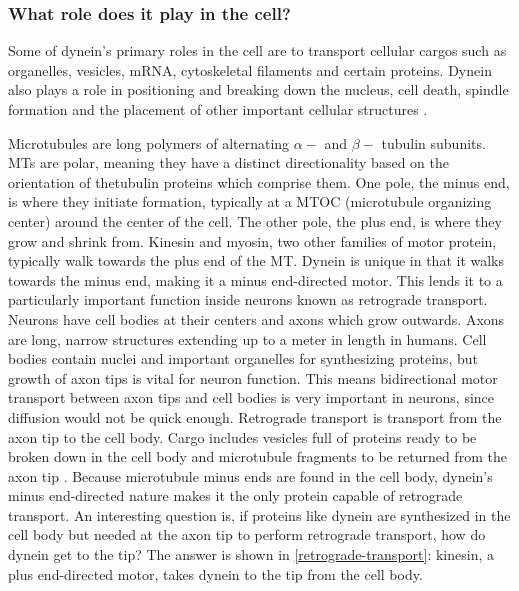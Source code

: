 \documentclass[10pt]{article} %
\begin{document}
\subsubsection{What role does it play in the cell?}
Some of dynein's primary roles in the cell are to transport cellular cargos such as organelles, vesicles, mRNA, cytoskeletal filaments and certain proteins. Dynein also plays a role in positioning and breaking down the nucleus, cell death, spindle formation and the placement of other important cellular structures \cite{valetoolbox}.

Microtubules are long polymers of alternating $\alpha-$ and $\beta-$ tubulin subunits. MTs are polar, meaning they have a distinct directionality based on the orientation of thetubulin proteins which comprise them. One pole, the minus end, is where they initiate formation, typically at a MTOC (microtubule organizing center) around the center of the cell. The other pole, the plus end, is where they grow and shrink from. Kinesin and myosin, two other families of motor protein, typically walk towards the plus end of the MT. Dynein is unique in that it walks towards the minus end, making it a minus end-directed motor. This lends it to a particularly important function inside neurons known as retrograde transport.\\

Neurons have cell bodies at their centers and axons which grow outwards. Axons are long, narrow structures extending up to a meter in length in humans. Cell bodies contain nuclei and important organelles for synthesizing proteins, but growth of axon tips is vital for neuron function. This means bidirectional motor transport between axon tips and cell bodies is very important in neurons, since diffusion would not be quick enough. Retrograde transport is transport from the axon tip to the cell body. Cargo includes vesicles full of proteins ready to be broken down in the cell body and microtubule fragments to be returned from the axon tip \cite{neuroanatomy}. Because microtubule minus ends are found in the cell body, dynein's minus end-directed nature makes it the only protein capable of retrograde transport. An interesting question is, if proteins like dynein are synthesized in the cell body but needed at the axon tip to perform retrograde transport, how do dynein get to the tip? The answer is shown in \ref{retrograde-transport}: kinesin, a plus end-directed motor, takes dynein to the tip from the cell body.\\
\end{document}
